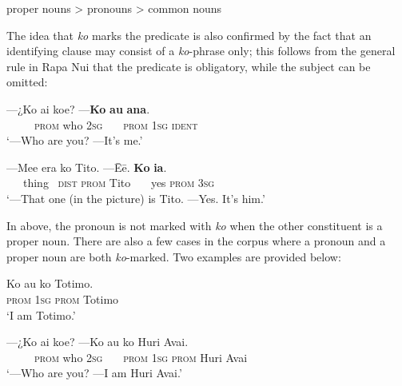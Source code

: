 \ea\label{ex:9.14a}
  proper nouns {\textgreater} pronouns {\textgreater} common nouns
\z

The idea that \textit{ko} marks the predicate is also confirmed by the fact that an identifying clause may consist of a \textit{ko}-phrase only; this follows from the general rule in Rapa Nui that the predicate is obligatory, while the subject can be omitted:

\ea\label{ex:9.15}
\gll —¿Ko ai koe? —\textbf{Ko} \textbf{au} \textbf{{\ꞌ}ana}. \\
~~~~~\textsc{prom} who \textsc{2sg} ~~~\textsc{prom} \textsc{1sg} \textsc{ident} \\

\glt 
‘—Who are you? —It’s me.’ \textstyleExampleref{[Mtx-7-04.071–072]}
\z

\ea\label{ex:9.16}
\gll —Me{\ꞌ}e era ko Tito. —{\ꞌ}Ēē. \textbf{Ko} \textbf{ia}. \\
~~~thing~ \textsc{dist} \textsc{prom} Tito ~~~yes \textsc{prom} \textsc{3sg} \\

\glt 
‘—That one (in the picture) is Tito. —Yes. It’s him.’ \textstyleExampleref{[R414.163–165]}
\z

In  above, the pronoun is not marked with \textit{ko} when the other constituent is a proper noun. There are also a few cases in the corpus where a pronoun and a proper noun are both \textit{ko}{}-marked. Two examples are provided below:

\ea\label{ex:9.17}
\gll Ko au ko Totimo. \\
\textsc{prom} \textsc{1sg} \textsc{prom} Totimo \\

\glt 
‘I am Totimo.’ \textstyleExampleref{[R399.193]} 
\z

\ea\label{ex:9.18}
\gll —¿Ko ai koe? —Ko au ko Huri {\ꞌ}Avai. \\
~~~~~\textsc{prom} who \textsc{2sg} ~~~\textsc{prom} \textsc{1sg} \textsc{prom} Huri Avai \\

\glt
‘—Who are you? —I am Huri Avai.’ \textstyleExampleref{[Mtx-3-01.127–128]}
\z

